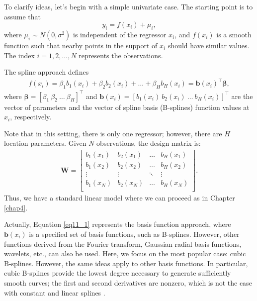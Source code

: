 To clarify ideas, let's begin with a simple univariate case. The starting point is to assume that  
\[
y_i = f(x_{i}) + \mu_i,
\]  
where \(\mu_i \sim N(0, \sigma^2)\) is independent of the regressor \(x_{i}\), and \(f(x_{i})\) is a smooth function such that nearby points in the support of \(x_{i}\) should have similar values. The index \(i = 1,2,\dots, N\) represents the observations.  

The spline approach defines  
\begin{align}\label{eq11_1}
	f(x_{i}) = \beta_{1}b_1(x_{i}) + \beta_{2}b_2(x_{i}) + \dots + \beta_{H}b_H(x_{i}) = \boldsymbol{b}(x_{i})^{\top}\boldsymbol{\beta},
\end{align}  
where \(\boldsymbol{\beta} = [\beta_{1} \ \beta_{2} \ \dots \ \beta_{H}]^{\top}\) and \(\boldsymbol{b}(x_{i}) = [b_1(x_{i}) \ b_2(x_{i}) \ \dots \ b_H(x_{i})]^{\top}\) are the vector of parameters and the vector of spline basis (B-splines) function values at \(x_{i}\), respectively.  

Note that in this setting, there is only one regressor; however, there are \(H\) location parameters. Given \(N\) observations, the design matrix is:
\begin{align*}
	\boldsymbol{W}=\begin{bmatrix}
		b_1(x_{1}) & b_2(x_{1}) & \dots & b_H(x_{1})\\
		b_1(x_{2}) & b_2(x_{2}) & \dots & b_H(x_{2})\\
		\vdots & \vdots & \ddots & \vdots \\
		b_1(x_{N}) & b_2(x_{N}) & \dots & b_H(x_{N})\\
	\end{bmatrix}.
\end{align*} 
Thus, we have a standard linear model where we can proceed as in Chapter \ref{chap4}.

Actually, Equation \ref{eq11_1} represents the basis function approach, where \(\boldsymbol{b}(x_{i})\) is a specified set of basis functions, such as B-splines. However, other functions derived from the Fourier transform, Gaussian radial basis functions, wavelets, etc., can also be used. Here, we focus on the most popular case: cubic B-splines. However, the same ideas apply to other basis functions. In particular, cubic B-splines provide the lowest degree necessary to generate sufficiently smooth curves; the first and second derivatives are nonzero, which is not the case with constant and linear splines \cite{BMCP2021}.  

